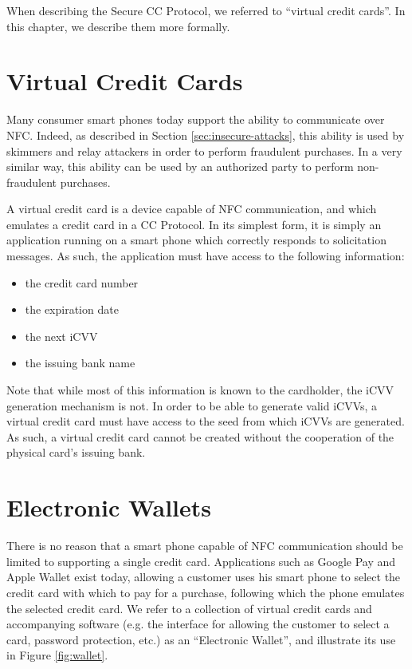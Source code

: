 When describing the Secure CC Protocol, we referred to ``virtual credit cards''.
In this chapter, we describe them more formally.

\section{Virtual Credit Cards}

Many consumer smart phones today support the ability to communicate over NFC.
Indeed, as described in Section \ref{sec:insecure-attacks}, this ability is used by skimmers and relay attackers in order to perform fraudulent purchases.
In a very similar way, this ability can be used by an authorized party to perform non-fraudulent purchases.

A virtual credit card is a device capable of NFC communication, and which emulates a credit card in a CC Protocol.
In its simplest form, it is simply an application running on a smart phone which correctly responds to solicitation messages.
As such, the application must have access to the following information:

\begin{itemize}
\item the credit card number
\item the expiration date
\item the next iCVV
\item the issuing bank name
\end{itemize}

Note that while most of this information is known to the cardholder, the iCVV generation mechanism is not.
In order to be able to generate valid iCVVs, a virtual credit card must have access to the seed from which iCVVs are generated.
As such, a virtual credit card cannot be created without the cooperation of the physical card's issuing bank.


\section{Electronic Wallets}

There is no reason that a smart phone capable of NFC communication should be limited to supporting a single credit card.
Applications such as Google Pay and Apple Wallet exist today,
    allowing a customer uses his smart phone to select the credit card with which to pay for a purchase,
    following which the phone emulates the selected credit card.
We refer to a collection of virtual credit cards and accompanying software
    (e.g. the interface for allowing the customer to select a card, password protection, etc.) as an ``Electronic Wallet'',
    and illustrate its use in Figure \ref{fig:wallet}.

